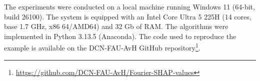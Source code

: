 \documentclass[letterpaper,11pt]{article}
\numberwithin{equation}{section}
\numberwithin{equation}{section}
\begin{document}
The experiments were conducted on a local machine running Windows 11 (64-bit, build 26100). The system is equipped with an Intel Core Ultra 5 225H (14 cores, base 1.7 GHz, x86 64/AMD64) and 32 Gb of RAM. The algorithms were implemented in Python 3.13.5 (Anaconda). The code used to reproduce the example is available on the DCN-FAU-AvH GitHub repository\footnote{\url{https://github.com/DCN-FAU-AvH/Fourier-SHAP-values}}. 


\end{document}
